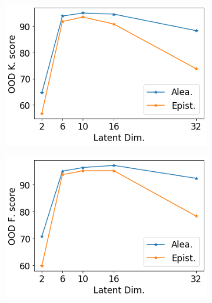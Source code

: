 \begin{figure}[ht]
\begin{subfigure}[t]{0.33 \textwidth}
    \end{subfigure}%

    \begin{subfigure}[t]{0.33 \textwidth}
        \centering
        \includegraphics[width=1. \textwidth]{sections/006_neurips2020/figures/lat_dim_minst_ood_1.png}
    \end{subfigure}%
    \begin{subfigure}[t]{0.33 \textwidth}
        \centering
        \includegraphics[width=1. \textwidth]{sections/006_neurips2020/figures/lat_dim_minst_ood_2.png}
    \end{subfigure}%
    

\end{figure}
